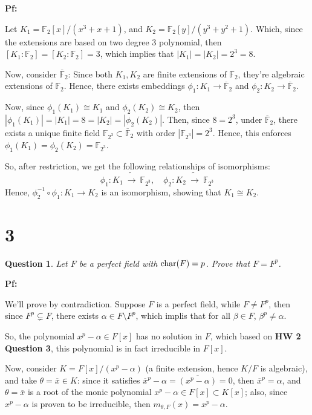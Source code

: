 \documentclass{article}
\newtheorem{question}{Question}
\begin{document}
\textbf{Pf:}

Let $K_1=\mathbb{F}_2[x]/(x^3+x+1)$, and $K_2=\mathbb{F}_2[y]/(y^3+y^2+1)$. Which, since the extensions are based on two degree $3$ polynomial, then $[K_1:\mathbb{F}_2]=[K_2:\mathbb{F}_2]=3$, which implies that $|K_1| = |K_2| = 2^3=8$.

Now, consider $\overline{\mathbb{F}}_2$: Since both $K_1,K_2$ are finite extensions of $\mathbb{F}_2$, they're algebraic extensions of $\mathbb{F}_2$. Hence, there exists embeddings $\phi_1:K_1\rightarrow \overline{\mathbb{F}}_2$ and $\phi_2:K_2\rightarrow\overline{\mathbb{F}}_2$.

Now, since $\phi_1(K_1)\cong K_1$ and $\phi_2(K_2)\cong K_2$, then $|\phi_1(K_1)|=|K_1|=8=|K_2|=|\phi_2(K_2)|$. Then, since $8=2^3$, under $\overline{\mathbb{F}}_2$, there exists a unique finite field $\mathbb{F}_{2^3}\subset\overline{\mathbb{F}}_2$ with order $|\mathbb{F}_{2^3}|=2^3$. Hence, this enforces $\phi_1(K_1)=\phi_2(K_2)=\mathbb{F}_{2^3}$.

So, after restriction, we get the following relationships of isomorphisms:
$$\phi_1:K_1\ \tilde{\rightarrow}\ \mathbb{F}_{2^3},\quad \phi_2:K_2\ \tilde{\rightarrow}\ \mathbb{F}_{2^3}$$
Hence, $\phi_2^{-1}\circ \phi_1:K_1\rightarrow K_2$ is an isomorphism, showing that $K_1\cong K_2$.

\hfil



\break

\section*{3}
\begin{myBox}[]{}
    \begin{question}
        Let $F$ be a perfect field with $\textmd{char}(F)=p$. Prove that $F=F^p$.
    \end{question}
\end{myBox}

\textbf{Pf:}

We'll prove by contradiction. Suppose $F$ is a perfect field, while $F\neq F^p$, then since $F^p\subsetneq F$, there exists $\alpha\in F\setminus F^p$, which implis that for all $\beta\in F$, $\beta^p\neq \alpha$.

So, the polynomial $x^p-\alpha \in F[x]$ has no solution in $F$, which based on \textbf{HW 2 Question 3}, this polynomial is in fact irreducible in $F[x]$.

\hfil

Now, consider $K=F[x]/(x^p-\alpha)$ (a finite extension, hence $K/F$ is algebraic), and take $\theta=\overline{x}\in K$: since it satisfies $\overline{x}^p-\alpha = \overline{(x^p-\alpha)}=0$, then $\overline{x}^p=\alpha$, and $\theta = \overline{x}$ is a root of the monic polynomial $x^p-\alpha\in F[x]\subset K[x]$; also, since $x^p-\alpha$ is proven to be irreducible, then $m_{\theta,F}(x)=x^p-\alpha$.
\end{document}

